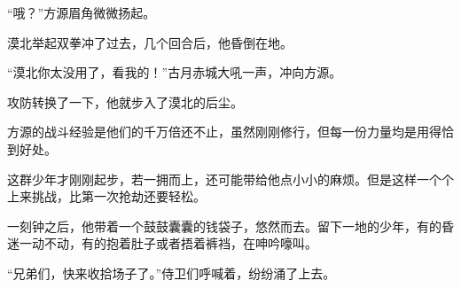\begin{this_body}
“哦？”方源眉角微微扬起。

漠北举起双拳冲了过去，几个回合后，他昏倒在地。

“漠北你太没用了，看我的！”古月赤城大吼一声，冲向方源。

攻防转换了一下，他就步入了漠北的后尘。

方源的战斗经验是他们的千万倍还不止，虽然刚刚修行，但每一份力量均是用得恰到好处。

这群少年才刚刚起步，若一拥而上，还可能带给他点小小的麻烦。但是这样一个个上来挑战，比第一次抢劫还要轻松。

一刻钟之后，他带着一个鼓鼓囊囊的钱袋子，悠然而去。留下一地的少年，有的昏迷一动不动，有的抱着肚子或者捂着裤裆，在呻吟嚎叫。

“兄弟们，快来收拾场子了。”侍卫们呼喊着，纷纷涌了上去。

\end{this_body}

